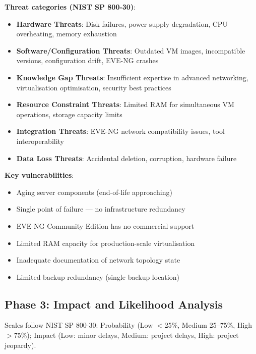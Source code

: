 \textbf{Threat categories (NIST SP 800-30)}:
\begin{itemize}
\item \textbf{Hardware Threats}: Disk failures, power supply degradation, CPU overheating,
      memory exhaustion
\item \textbf{Software/Configuration Threats}: Outdated VM images, incompatible versions,
      configuration drift, EVE-NG crashes
\item \textbf{Knowledge Gap Threats}: Insufficient expertise in advanced networking,
      virtualisation optimisation, security best practices
\item \textbf{Resource Constraint Threats}: Limited RAM for simultaneous VM operations,
      storage capacity limits
\item \textbf{Integration Threats}: EVE-NG network compatibility issues, tool interoperability
\item \textbf{Data Loss Threats}: Accidental deletion, corruption, hardware failure
\end{itemize}

\textbf{Key vulnerabilities}:
\begin{itemize}
\item Aging server components (end-of-life approaching)
\item Single point of failure --- no infrastructure redundancy
\item EVE-NG Community Edition has no commercial support
\item Limited RAM capacity for production-scale virtualisation
\item Inadequate documentation of network topology state
\item Limited backup redundancy (single backup location)
\end{itemize}

\subsection{Phase 3: Impact and Likelihood Analysis}

Scales follow NIST SP 800-30: Probability (Low $<$25\%, Medium 25--75\%, High $>$75\%);
Impact (Low: minor delays, Medium: project delays, High: project jeopardy).

